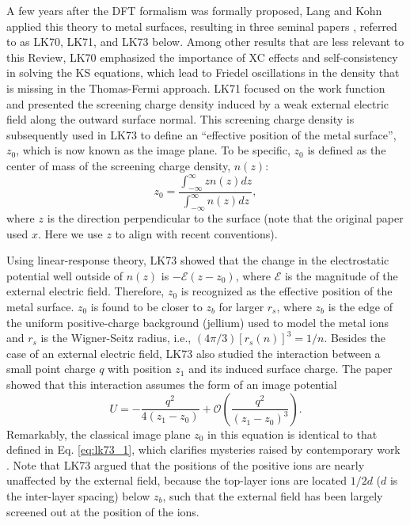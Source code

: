 \documentclass[aip, amsmath, amssymb, reprint, longbibliography]{revtex4-2}
\begin{document}
A few years after the DFT formalism was formally proposed, Lang and Kohn applied this theory to metal surfaces, resulting in three seminal papers \cite{LK70,LK71,LK73}, referred to as LK70, LK71, and LK73 below. Among other results that are less relevant to this Review, LK70 \cite{LK70} emphasized the importance of XC effects and self-consistency in solving the KS equations, which lead to Friedel oscillations in the density that is missing in the Thomas-Fermi approach. LK71 \cite{LK71} focused on the work function and presented the screening charge density induced by a weak external electric field along the outward surface normal. This screening charge density is subsequently used in LK73 \cite{LK73} to define an ``effective position of the metal surface'', $z_0$, which is now known as the image plane. To be specific, $z_0$ is defined as the center of mass of the screening charge density, $n(z)$:
\begin{equation}
z_0 = \frac{\int_{-\infty}^{\infty}zn(z)dz}{\int_{-\infty}^\infty n(z)dz},        
\label{eq:lk73_1}
\end{equation}
where $z$ is the direction perpendicular to the surface (note that the original paper used $x$. Here we use $z$ to align with recent conventions). 

Using linear-response theory, LK73 \cite{LK73} showed that the change in the electrostatic potential well outside of $n(z)$ is $-\mathcal{E}(z-z_0)$, where $\mathcal{E}$ is the magnitude of the external electric field. Therefore, $z_0$ is recognized as the effective position of the metal surface. $z_0$ is found to be closer to $z_b$ for larger $r_s$, where $z_b$ is the edge of the uniform positive-charge background (jellium) used to model the metal ions and $r_s$ is the Wigner-Seitz radius, i.e., $(4\pi/3)[r_s(n)]^3=1/n$. Besides the case of an external electric field, LK73 also studied the interaction between a small point charge $q$ with position $z_1$ and its induced surface charge. The paper showed that this interaction assumes the form of an image potential
\begin{equation}
U = -\frac{q^2}{4(z_1-z_0)}+\mathcal{O}\left(\frac{q^2}{(z_1-z_0)^3}\right).
\label{eq:lk73_2}
\end{equation}
Remarkably, the classical image plane $z_0$ in this equation is identical to that defined in Eq. \eqref{eq:lk73_1}, which clarifies mysteries raised by contemporary work \cite{AH72}. Note that LK73 argued that the positions of the positive ions are nearly unaffected by the external field, because the top-layer ions are located $1/2d$ ($d$ is the inter-layer spacing) below $z_b$, such that the external field has been largely screened out at the position of the ions.
\end{document}
